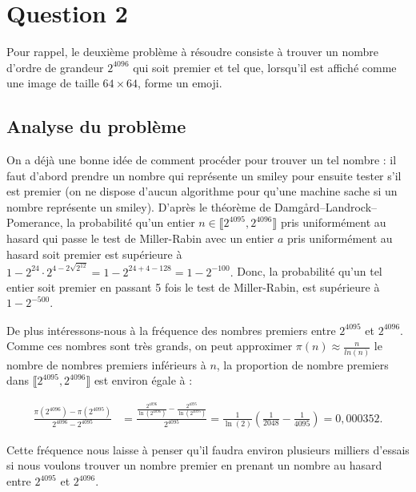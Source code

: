\documentclass{article}
\begin{document}
\newpage



\section{Question 2}

Pour rappel, le deuxième problème à résoudre consiste à trouver un nombre d'ordre de grandeur $2^{4096}$ qui soit premier et tel que, lorsqu'il est affiché comme une image de taille $64\times 64$, forme un emoji.

\subsection{Analyse du problème}

On a déjà une bonne idée de comment procéder pour trouver un tel nombre : il faut d'abord prendre un nombre qui représente un smiley pour ensuite tester s'il est premier (on ne dispose d'aucun algorithme pour qu'une machine sache si un nombre représente un smiley). D'après le théorème de Damgård–Landrock–Pomerance, la probabilité qu'un entier $n \in \llbracket 2^{4095}, 2^{4096} \rrbracket$ pris uniformément au hasard qui passe le test de Miller-Rabin avec un entier $a$ pris uniformément au hasard soit premier est supérieure à $\displaystyle 1 - 2^{24} \cdot 2^{4 - 2 \sqrt{2^{12}}} = 1 - 2^{24 + 4 - 128} = 1 - 2^{-100}.$ Donc, la probabilité qu'un tel entier soit premier en passant 5 fois le test de Miller-Rabin, est supérieure à $1 - 2^{-500}.$\\ \\
De plus intéressons-nous à la fréquence des nombres premiers entre $2^{4095}$ et $2^{4096}$. Comme ces nombres sont très grands, on peut approximer $\pi(n) \approx \frac{n}{ln(n)}$ le nombre de nombres premiers inférieurs à $n$, la proportion de nombre premiers dans $\llbracket 2^{4095}, 2^{4096} \rrbracket$ est environ égale à :

\begin{align}
    \frac{\pi(2^{4096}) - \pi(2^{4095})}{2^{4096} - 2^{4095}} 
    &= \frac{ \frac{2^{4096}}{\ln(2^{4096})} - \frac{2^{4095}}{\ln(2^{4095})}}{2^{4095}} = \frac{1}{\ln(2)}(\frac{1}{2048} - \frac{1}{4095}) = 0,000352.
    \label{freq}
\end{align}

Cette fréquence nous laisse à penser qu'il faudra environ plusieurs milliers d'essais si nous voulons trouver un nombre premier en prenant un nombre au hasard entre $2^{4095}$ et $2^{4096}$.
\end{document}
